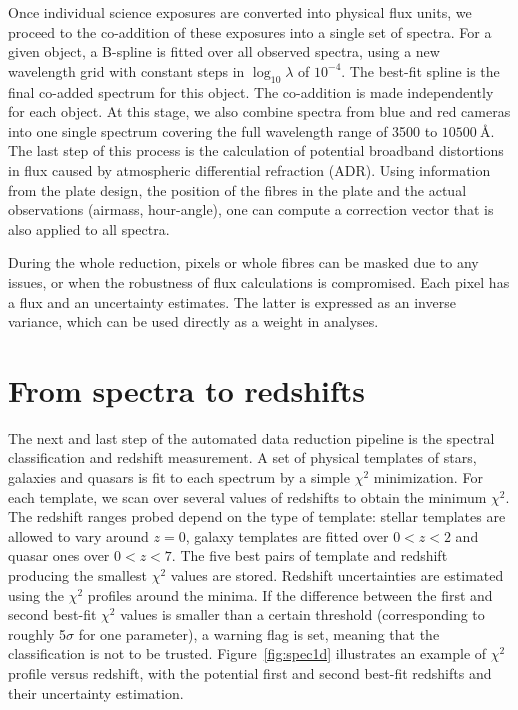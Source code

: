 Once individual science exposures are converted into physical flux units, 
we proceed to the co-addition of these exposures into a single set of spectra. 
For a given object, a B-spline is fitted over all observed spectra, 
using a new wavelength grid with constant steps in $\log_{10} \lambda$ of $10^{-4}$. 
The best-fit spline is the final co-added spectrum for this object. 
The co-addition is made independently for each object. 
At this stage, we also combine spectra from blue and red cameras into 
one single spectrum covering the full wavelength range of 3500 to $\qty{10500}{\angstrom}$. 
The last step of this process is the calculation of potential broadband 
distortions in flux caused by atmospheric differential refraction (ADR). 
Using information from the plate design, the position of the fibres in 
the plate and the actual observations (airmass, hour-angle), one can 
compute a correction vector that is also applied to all spectra. 

During the whole reduction, pixels or whole fibres can be masked due to any issues, 
or when the robustness of flux calculations is compromised. 
Each pixel has a flux and an uncertainty estimates. The latter is expressed 
as an inverse variance, which can be used directly as a weight in analyses.



\section{From spectra to redshifts}
\label{spectro:pipeline1d}

The next and last step of the automated data reduction pipeline is the 
spectral classification and redshift measurement. 
A set of physical templates of stars, galaxies and quasars is fit to 
each spectrum by a simple $\chi^2$ minimization. For each template, 
we scan over several values of redshifts to obtain the minimum $\chi^2$. 
The redshift ranges probed depend on the type of template: 
stellar templates are allowed to vary around $z =0$, 
galaxy templates are fitted over $0 < z < 2$ and quasar ones over $0 < z < 7$. 
The five best pairs of template and redshift producing the smallest $\chi^2$ values are stored. 
Redshift uncertainties are estimated using the $\chi^2$ profiles around the minima.
If the difference between the first and second best-fit $\chi^2$ values
is smaller than a certain threshold (corresponding to roughly 
5$\sigma$ for one parameter), a warning flag is set, meaning 
that the classification is not to be trusted. 
Figure~\ref{fig:spec1d} illustrates an example of $\chi^2$ profile versus redshift,
with the potential first and second best-fit redshifts and their uncertainty estimation. 

